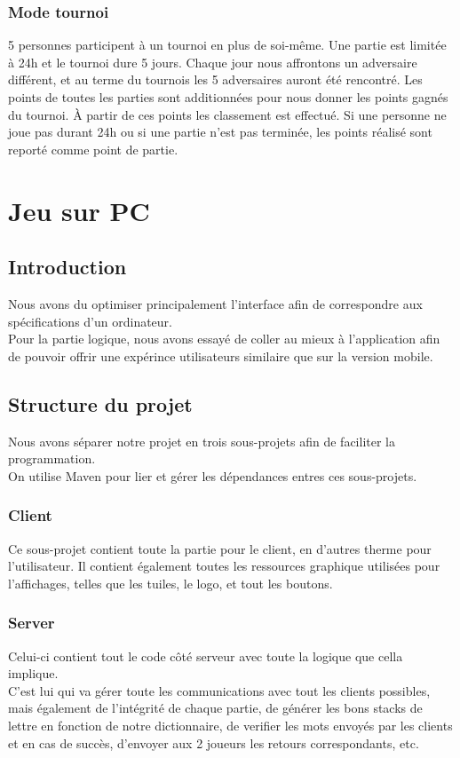 \documentclass[a4paper,12pt]{article}
\begin{document}
			\subsubsection{Mode tournoi}
			5 personnes participent à un tournoi en plus de soi-même. Une partie est limitée à 24h et le tournoi dure 5 jours. Chaque jour nous affrontons un adversaire différent, et au terme du tournois les 5 adversaires auront été rencontré. Les points de toutes les parties sont additionnées pour nous donner les points gagnés du tournoi. À partir de ces points les classement est effectué.
			Si une personne ne joue pas durant 24h ou si une partie n'est pas terminée, les points réalisé sont reporté comme point de partie.
			
	
	\section{Jeu sur PC}
	\subsection{Introduction}
	Nous avons du optimiser principalement l'interface afin de correspondre aux spécifications d'un ordinateur.\\
	Pour la partie logique, nous avons essayé de coller au mieux à l'application afin de pouvoir offrir une expérince utilisateurs similaire que sur la version mobile. 
	
	\subsection{Structure du projet}
	Nous avons 	séparer notre projet en trois sous-projets afin de faciliter la programmation.  \\
	On utilise Maven pour lier et gérer les dépendances entres ces sous-projets.
	
		\subsubsection{Client}
		Ce sous-projet contient toute la partie pour le client, en d'autres therme pour l'utilisateur. Il contient également toutes les ressources graphique utilisées pour l'affichages, telles que les tuiles, le logo, et tout les boutons.
		
		\subsubsection{Server}
		Celui-ci contient tout le code côté serveur avec toute la logique que cella implique. \\
		C'est lui qui va gérer toute les communications avec tout les clients possibles, mais également de l'intégrité de chaque partie, de générer les bons stacks de lettre en fonction de notre dictionnaire, de verifier les mots envoyés par les clients et en cas de succès, d'envoyer aux 2 joueurs les retours correspondants, etc.
		
\end{document}

